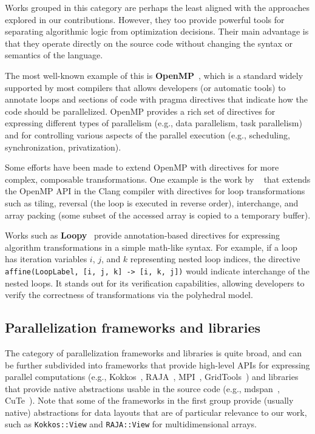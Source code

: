 Works grouped in this category are perhaps the least aligned with the approaches explored in our contributions. However, they too provide powerful tools for separating algorithmic logic from optimization decisions. Their main advantage is that they operate directly on the source code without changing the syntax or semantics of the language.

The most well-known example of this is \textbf{OpenMP}~\cite{dagum1998openmp}, which is a standard widely supported by most compilers that allows developers (or automatic tools) to annotate loops and sections of code with pragma directives that indicate how the code should be parallelized. OpenMP provides a rich set of directives for expressing different types of parallelism (e.g., data parallelism, task parallelism) and for controlling various aspects of the parallel execution (e.g., scheduling, synchronization, privatization).

Some efforts have been made to extend OpenMP with directives for more complex, composable transformations. One example is the work by \citeauthor{kruse2018user}~\cite{kruse2018user} that extends the OpenMP API in the Clang compiler with directives for loop transformations such as tiling, reversal (the loop is executed in reverse order), interchange, and array packing (some subset of the accessed array is copied to a temporary buffer).

Works such as \textbf{Loopy}~\cite{namjoshi2016loopy} provide annotation-based directives for expressing algorithm transformations in a simple math-like syntax. For example, if a loop has iteration variables $i$, $j$, and $k$ representing nested loop indices, the directive \texttt{affine(LoopLabel, {[i, j, k] -> [i, k, j]})} would indicate interchange of the nested loops. It stands out for its verification capabilities, allowing developers to verify the correctness of transformations via the polyhedral model.


\subsection{Parallelization frameworks and libraries}\label{sec:parallelization-frameworks}

The category of parallelization frameworks and libraries is quite broad, and can be further subdivided into frameworks that provide high-level APIs for expressing parallel computations (e.g., Kokkos~\cite{trott2021kokkos}, RAJA~\cite{beckingsale2019raja}, MPI~\cite{mpi-5.0}, GridTools~\cite{afanasyev2021gridtools}) and libraries that provide native abstractions usable in the source code (e.g., mdspan~\cite{trott2022mdspan}, CuTe~\cite{thakkar2023cutlass}). Note that some of the frameworks in the first group provide (usually native) abstractions for data layouts that are of particular relevance to our work, such as \lstinline{Kokkos::View} and \lstinline{RAJA::View} for multidimensional arrays.

